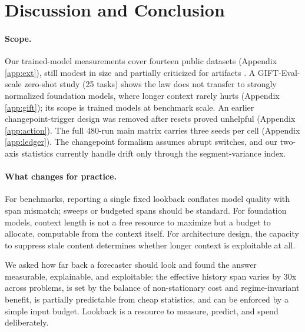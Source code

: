 \section{Discussion and Conclusion}

\paragraph{Scope.}
Our trained-model measurements cover fourteen public datasets (Appendix \ref{app:ext}), still modest in size and partially criticized for artifacts \citep{fern, timebench}. A GIFT-Eval-scale zero-shot study (25 tasks) shows the law does not transfer to strongly normalized foundation models, where longer context rarely hurts (Appendix \ref{app:gift}); its scope is trained models at benchmark scale. An earlier changepoint-trigger design was removed after resets proved unhelpful (Appendix \ref{app:action}). The full 480-run main matrix carries three seeds per cell (Appendix \ref{app:ledger}). The changepoint formalism assumes abrupt switches, and our two-axis statistics currently handle drift only through the segment-variance index.

\paragraph{What changes for practice.}
For benchmarks, reporting a single fixed lookback conflates model quality with span mismatch; sweeps or budgeted spans should be standard. For foundation models, context length is not a free resource to maximize but a budget to allocate, computable from the context itself. For architecture design, the capacity to suppress stale content determines whether longer context is exploitable at all.

We asked how far back a forecaster should look and found the answer measurable, explainable, and exploitable: the effective history span varies by 30x across problems, is set by the balance of non-stationary cost and regime-invariant benefit, is partially predictable from cheap statistics, and can be enforced by a simple input budget. Lookback is a resource to measure, predict, and spend deliberately.
